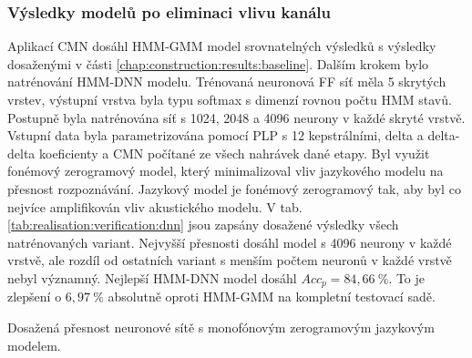 \subsubsection{Výsledky modelů po eliminaci vlivu kanálu}

Aplikací CMN dosáhl HMM-GMM model srovnatelných výsledků s výsledky dosaženými v části \ref{chap:construction:results:baseline}.
Dalším krokem bylo natrénování HMM-DNN modelu.
Trénovaná neuronová FF síť měla 5 skrytých vrstev, výstupní vrstva byla typu softmax s dimenzí rovnou počtu HMM stavů.
Postupně byla natrénována síť s 1024, 2048 a 4096 neurony v každé skryté vrstvě.
Vstupní data byla parametrizována pomocí PLP s 12 kepstrálními, delta a delta-delta koeficienty a CMN počítané ze všech nahrávek dané etapy.
Byl využit fonémový zerogramový model, který minimalizoval vliv jazykového modelu na přesnost rozpoznávání.
Jazykový model je fonémový zerogramový tak, aby byl co nejvíce amplifikován vliv akustického modelu.
V tab. \ref{tab:realisation:verification:dnn} jsou zapsány dosažené výsledky všech natrénovaných variant.
Nejvyšší přesnosti dosáhl model s 4096 neurony v každé vrstvě, ale rozdíl od ostatních variant s menším počtem neuronů v každé vrstvě nebyl významný.
Nejlepší HMM-DNN model dosáhl $Acc_{p} = 84,66\ \%$.
To je zlepšení o $6,97\ \%$ absolutně oproti HMM-GMM na kompletní testovací sadě.

\begin{table}[htpb]
  \centering
  \def\arraystretch{1.5}
  \caption[Přesnost neuronové sítě s monofónovým zerogramovým LM.]{Dosažená přesnost neuronové sítě s monofónovým zerogramovým jazykovým modelem.}
  \label{tab:realisation:verification:dnn}
\end{table}
